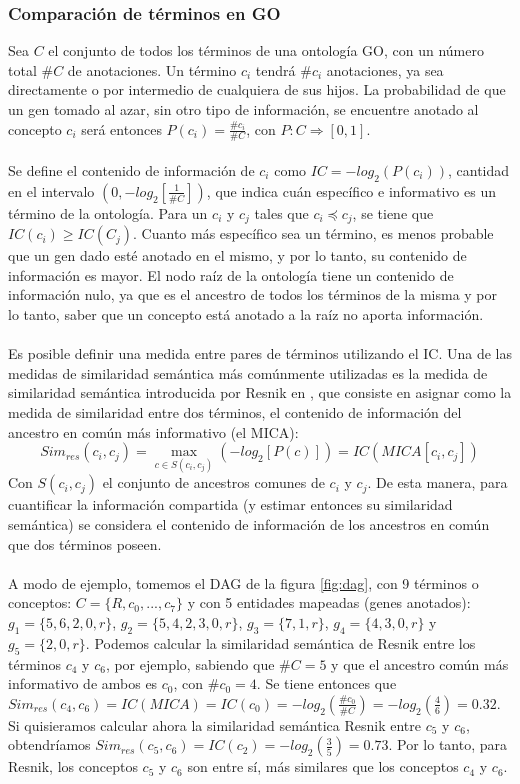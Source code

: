 \subsubsection{Comparación de términos en GO}
Sea $C$ el conjunto de todos los términos de una ontología GO, con un número total $\#C$ de anotaciones. Un término $c_i$ tendrá $\#c_i$ anotaciones, ya sea directamente o por intermedio de cualquiera de sus hijos. La probabilidad de que un gen tomado al azar, sin otro tipo de información, se encuentre anotado al concepto $c_i$ será entonces $P(c_i) = \frac{\#c_i}{\#C}$, con $P:C\Rightarrow [0,1]$.\\\\
Se define el contenido de información de $c_i$ como $IC = -log_2(P(c_i))$, cantidad en el intervalo $(0, -log_2[\frac{1}{\#C}])$, que indica cuán específico e informativo es un término de la ontología. Para un $c_i$ y $c_j$ tales que $c_i \preceq c_j$, se tiene que $IC(c_i) \geq IC(C_j)$. Cuanto más específico sea un término, es menos probable que un gen dado esté anotado en el mismo, y por lo tanto, su contenido de información es mayor. El nodo raíz de la ontología tiene un contenido de información nulo, ya que es el ancestro de todos los términos de la misma y por lo tanto, saber que un concepto está anotado a la raíz no aporta información.\\\\
Es posible definir una medida entre pares de términos utilizando el IC. Una de las medidas de similaridad semántica más comúnmente utilizadas es la medida de similaridad semántica introducida por Resnik en \cite{Resnik1995}, que consiste en asignar como la medida de similaridad entre dos términos, el contenido de información del ancestro en común más informativo (el MICA):
\begin{equation}
	Sim_{res}(c_i, c_j) = \max\limits_{c \in S(c_i, c_j)}(-log_2[P(c)]) = IC(MICA[c_i, c_j])
\end{equation}
Con $S(c_i, c_j)$ el conjunto de ancestros comunes de $c_i$ y $c_j$. De esta manera, para cuantificar la información compartida (y estimar entonces su similaridad semántica) se considera el contenido de información de los ancestros en común que dos términos poseen.\\\\
A modo de ejemplo, tomemos el DAG de la figura \ref{fig:dag}, con 9 términos o conceptos: $C=\{R, c_0,...,c_7\}$ y con 5 entidades mapeadas (genes anotados): $g_1=\{5, 6, 2, 0, r\}$, $g_2=\{5, 4, 2, 3, 0, r\}$, $g_3=\{7, 1, r\}$, $g_4=\{4, 3, 0, r\}$ y $g_5=\{2, 0, r\}$. Podemos calcular la similaridad semántica de Resnik entre los términos $c_4$ y $c_6$, por ejemplo, sabiendo que $\#C = 5$ y que el ancestro común más informativo de ambos es $c_0$, con $\#c_0=4$. Se tiene entonces que $Sim_{res}(c_4, c_6) = IC(MICA) = IC(c_0) = -log_2(\frac{\#c_0}{\#C}) = -log_2(\frac{4}{6}) = 0.32$. Si quisieramos calcular ahora la similaridad semántica Resnik entre $c_5$ y $c_6$, obtendríamos $Sim_{res}(c_5, c_6) = IC(c_2) = -log_2(\frac{3}{5}) = 0.73$. Por lo tanto, para Resnik, los conceptos $c_5$ y $c_6$ son entre sí, más similares que los conceptos $c_4$ y $c_6$.\\\\
